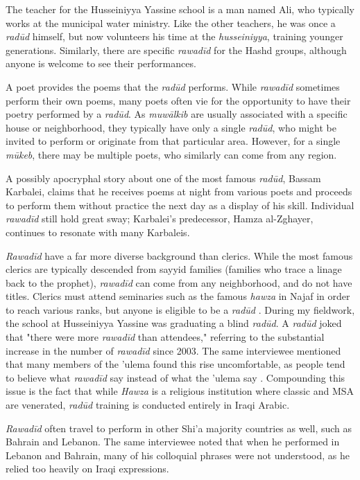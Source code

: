 The teacher for the Husseiniyya Yassine school is a man named Ali, who typically works at the municipal water ministry. Like the other teachers, he was once a \emph{radūd} himself, but now volunteers his time at the \emph{husseiniyya}, training younger generations. Similarly, there are specific \emph{rawadīd} for the Hashd groups, although anyone is welcome to see their performances. 

A poet provides the poems that the \emph{radūd} performs. While \emph{rawadīd} sometimes perform their own poems, many poets often vie for the opportunity to have their poetry performed by a \emph{radūd}. As \emph{muwālkib} are usually associated with a specific house or neighborhood, they typically have only a single \emph{radūd}, who might be invited to perform or originate from that particular area. However, for a single \emph{mūkeb}, there may be multiple poets, who similarly can come from any region. 

A possibly apocryphal story about one of the most famous \emph{radūd}, Bassam Karbalei, claims that he receives poems at night from various poets and proceeds to perform them without practice the next day as a display of his skill\cite{al-husseini_interview_2022}. Individual \emph{rawadīd} still hold great sway; Karbalei's predecessor, Hamza al-Zghayer, continues to resonate with many Karbaleis. 

\emph{Rawadīd} have a far more diverse background than clerics. While the most famous clerics are typically descended from sayyid families (families who trace a linage back to the prophet), \emph{rawadīd} can come from any neighborhood, and do not have titles. Clerics must attend seminaries such as the famous \emph{hawza} in Najaf in order to reach various ranks, but anyone is eligible to be a \emph{radūd} \cite{al-husseini_interview_2022}. During my fieldwork, the school at Husseiniyya Yassine was graduating a blind \emph{radūd}. A \emph{radūd} joked that "there were more \emph{rawadīd} than attendees," referring to the substantial increase in the number of \emph{rawadīd} since 2003. The same interviewee mentioned that many members of the 'ulema found this rise uncomfortable, as people tend to believe what \emph{rawadīd} say instead of what the 'ulema say \cite{al-husseini_interview_2022}. Compounding this issue is the fact that while \emph{Hawza} is a religious institution where classic and MSA are venerated, \emph{radūd} training is conducted entirely in Iraqi Arabic. 

\emph{Rawadīd} often travel to perform in other Shi'a majority countries as well, such as Bahrain and Lebanon. The same interviewee noted that when he performed in Lebanon and Bahrain, many of his colloquial phrases were not understood, as he relied too heavily on Iraqi expressions.


